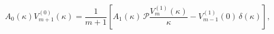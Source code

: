 \begin{equation}
A_0(\kappa)V_{m+1}^{(0)}(\kappa)
=\frac{1}{m+1}
\left[A_1(\kappa)\,\mathscr{P}\frac{V_{m}^{(1)}(\kappa)}{\kappa}
-V_{m-1}^{(1)}(0)\,\delta(\kappa)\right],
\label{C3'}
\end{equation}

